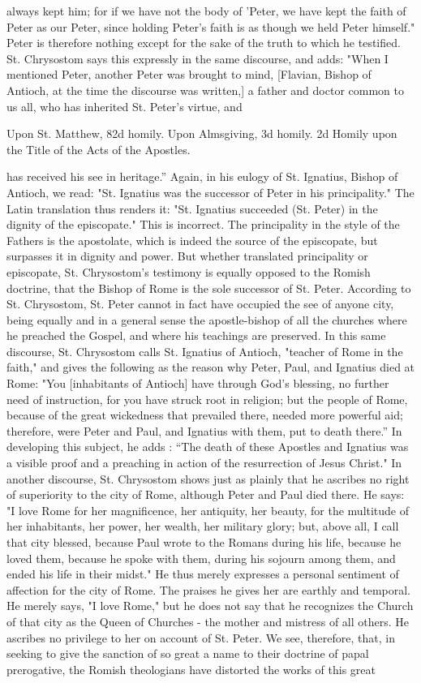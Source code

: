always kept him; for if we have not the body of 'Peter, we have kept the faith of Peter as our Peter, since holding Peter's faith is as though we held Peter himself." Peter is therefore nothing except for the sake of the truth to which he testified. St. Chrysostom says this expressly in the same discourse, and adds: "When I mentioned Peter, another Peter was brought to mind, [Flavian, Bishop of Antioch, at the time the discourse was written,] a father and doctor common to us all, who has inherited St. Peter's virtue, and

Upon St. Matthew, 82d homily. Upon Almsgiving, 3d homily. 2d Homily upon the Title of the Acts of the Apostles.

has received his see in heritage.” Again, in his eulogy of St. Ignatius, Bishop of Antioch, we read: "St. Ignatius was the successor of Peter in his principality." The Latin translation thus renders it: "St. Ignatius succeeded (St. Peter) in the dignity of the episcopate." This is incorrect. The principality in the style of the Fathers is the apostolate, which is indeed the source of the episcopate, but surpasses it in dignity and power. But whether translated principality or episcopate, St. Chrysostom's testimony is equally opposed to the Romish doctrine, that the Bishop of Rome is the sole successor of St. Peter. According to St. Chrysostom, St. Peter cannot in fact have occupied the see of anyone city, being equally and in a general sense the apostle-bishop of all the churches where he preached the Gospel, and where his teachings are preserved. In this same discourse, St. Chrysostom calls St. Ignatius of Antioch, "teacher of Rome in the faith," and gives the following as the reason why Peter, Paul, and Ignatius died at Rome: "You [inhabitants of Antioch] have through God's blessing, no further need of instruction, for you have struck root in religion; but the people of Rome, because of the great wickedness that prevailed there, needed more powerful aid; therefore, were Peter and Paul, and Ignatius with them, put to death there.” In developing this subject, he adds : “The death of these Apostles and Ignatius was a visible proof and a preaching in action of the resurrection of Jesus Christ." In another discourse, St. Chrysostom shows just as plainly that he ascribes no right of superiority to the city of Rome, although Peter and Paul died there. He says: "I love Rome for her magnificence, her antiquity, her beauty, for the multitude of her inhabitants, her power, her wealth, her military glory; but, above all, I call that city blessed, because Paul wrote to the Romans during his life, because he loved them, because he spoke with them, during his sojourn among them, and ended his life in their midst." He thus merely expresses a personal sentiment of affection for the city of Rome. The praises he gives her are earthly and temporal. He merely says, "I love Rome," but he does not say that he recognizes the Church of that city as the Queen of Churches - the mother and mistress of all others. He ascribes no privilege to her on account of St. Peter. We see, therefore, that, in seeking to give the sanction of so great a name to their doctrine of papal prerogative, the Romish theologians have distorted the works of this great 